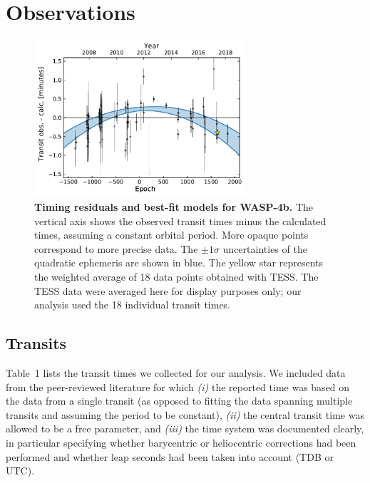 \documentclass[12pt,twocolumn,tighten,trackchanges]{aastex62}
\begin{document}
\section{Observations}
\label{sec:observations}

\begin{figure}[t]
	\begin{center}
		\leavevmode
		\includegraphics[width=0.7\textwidth]{f1.pdf}
	\end{center}
	\vspace{-0.7cm}
	\caption{ {\bf Timing residuals and best-fit models for WASP-4b.}
		The vertical axis shows the observed transit times minus the
		calculated times, assuming a constant orbital period.  More opaque
		points correspond to more precise data.  The $\pm1\sigma$
		uncertainties of the quadratic ephemeris are shown in blue.  The
		yellow star represents the weighted average of 18 data points
		obtained with TESS. The TESS data were averaged here for display
		purposes only; our analysis used the 18 individual transit times.
		\label{fig:times}
	}
\end{figure}


\subsection{Transits}

Table~1 lists the transit times we collected for our analysis.  We
included data from the peer-reviewed literature for which {\it (i)}
the reported time was based on the data from a single transit (as
opposed to fitting the data spanning multiple transits and assuming
the period to be constant), {\it (ii)} the central transit time was
allowed to be a free parameter, and {\it (iii)} the time system was
documented clearly, in particular specifying whether barycentric or
heliocentric corrections had been performed and whether leap seconds
had been taken into account (TDB or UTC).
\end{document}
